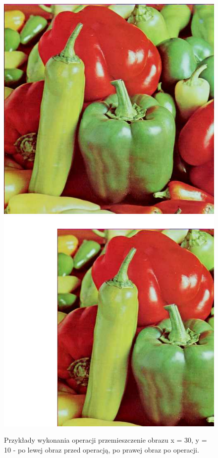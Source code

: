 \documentclass{article}
\begin{document}
\begin{figure}[!htb]
\centering
\includegraphics[scale=0.2]{img/peppers_24bit.png}
\includegraphics[scale=0.2]{img/Przemieszczenie_Obrazu_peppers_24bit.png} 
\caption{Przykłady wykonania operacji przemieszczenie obrazu x = 30, y = 10 - po lewej obraz przed operacją, po prawej obraz po operacji. }
\end{figure}
\end{document}
